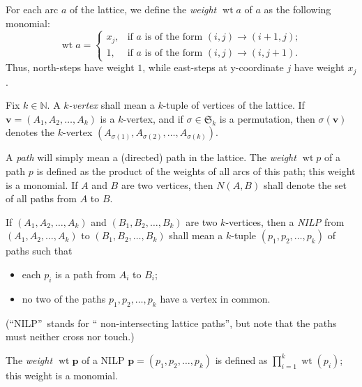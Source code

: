 \documentclass[reqno]{amsart}%
\newcommand{\0}{\phantom{c}}
\let\prodnonlimits\prod
\renewcommand{\prod}{\prodnonlimits\limits}
\newcommand{\defn}[1]{{\color{darkred}\emph{#1}}}
\theoremstyle{plain}
\theoremstyle{definition}
\numberwithin{equation}{section}
\begin{document}
For each arc $a$ of the lattice, we define the
\defn{weight $\operatorname{wt}a$} of $a$ as the following monomial:%
\[
\operatorname*{wt}a=%
\begin{cases}
x_{j}, & \text{if }a\text{ is of the form }\left(  i,j\right)  \rightarrow
\left(  i+1,j\right)  ;\\
1, & \text{if }a\text{ is of the form }\left(  i,j\right)  \rightarrow\left(
i,j+1\right)  .
\end{cases}
\]
Thus, north-steps have weight $1$, while east-steps at y-coordinate $j$ have
weight $x_{j}$.

Fix $k\in\mathbb{N}$. A \defn{$k$-vertex} shall mean a $k$-tuple of vertices
of the lattice. If $\mathbf{v}=\left(  A_{1},A_{2},\ldots,A_{k}\right)  $ is a
$k$-vertex, and if $\sigma\in\mathfrak{S}_{k}$ is a permutation, then
$\sigma\left(  \mathbf{v}\right)  $ denotes the $k$-vertex $\left(
A_{\sigma\left(  1\right)  },A_{\sigma\left(  2\right)  },\ldots
,A_{\sigma\left(  k\right)  }\right)  $.

A \defn{path} will simply mean a (directed) path in the lattice. The
\defn{weight $\operatorname{wt}p$} of a path $p$ is defined as the product of
the weights of all arcs of this path; this weight is a monomial. If $A$ and
$B$ are two vertices, then \defn{$N\left(  A,B\right)  $} shall denote the set
of all paths from $A$ to $B$.

If $\left(  A_{1},A_{2},\ldots,A_{k}\right)  $ and $\left(  B_{1},B_{2}%
,\ldots,B_{k}\right)  $ are two $k$-vertices, then a \defn{NILP} from $\left(
A_{1},A_{2},\ldots,A_{k}\right)  $ to $\left(  B_{1},B_{2},\ldots
,B_{k}\right)  $ shall mean a $k$-tuple $\left(  p_{1},p_{2},\ldots
,p_{k}\right)  $ of paths such that

\begin{itemize}
\item each $p_{i}$ is a path from $A_{i}$ to $B_{i}$;

\item no two of the paths $p_{1},p_{2},\ldots,p_{k}$ have a vertex in common.
\end{itemize}

(\textquotedblleft NILP\textquotedblright\ stands for \textquotedblleft
non-intersecting lattice paths\textquotedblright, but note that the paths must
neither cross nor touch.)

The \defn{weight $\operatorname{wt}\mathbf{p}$} of a NILP $\mathbf{p}=\left(
p_{1},p_{2},\ldots,p_{k}\right)  $ is defined as $\prod_{i=1}^{k}%
\operatorname*{wt}\left(  p_{i}\right)  $; this weight is a monomial.
\end{document}
